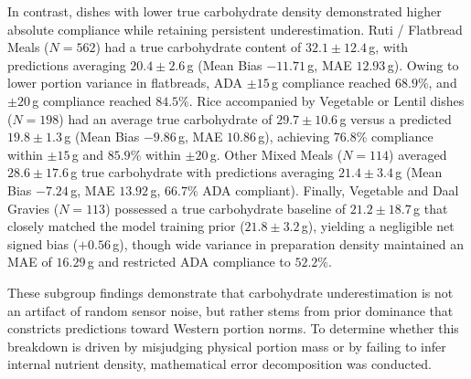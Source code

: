 \documentclass[utf8]{FrontiersinVancouver}
\begin{document}
In contrast, dishes with lower true carbohydrate density demonstrated higher absolute compliance while retaining persistent underestimation. Ruti / Flatbread Meals ($N=562$) had a true carbohydrate content of $32.1 \pm 12.4$\,g, with predictions averaging $20.4 \pm 2.6$\,g (Mean Bias $-11.71$\,g, MAE $12.93$\,g). Owing to lower portion variance in flatbreads, ADA $\pm 15$\,g compliance reached $68.9\%$, and $\pm 20$\,g compliance reached $84.5\%$. Rice accompanied by Vegetable or Lentil dishes ($N=198$) had an average true carbohydrate of $29.7 \pm 10.6$\,g versus a predicted $19.8 \pm 1.3$\,g (Mean Bias $-9.86$\,g, MAE $10.86$\,g), achieving $76.8\%$ compliance within $\pm 15$\,g and $85.9\%$ within $\pm 20$\,g. Other Mixed Meals ($N=114$) averaged $28.6 \pm 17.6$\,g true carbohydrate with predictions averaging $21.4 \pm 3.4$\,g (Mean Bias $-7.24$\,g, MAE $13.92$\,g, $66.7\%$ ADA compliant). Finally, Vegetable and Daal Gravies ($N=113$) possessed a true carbohydrate baseline of $21.2 \pm 18.7$\,g that closely matched the model training prior ($21.8 \pm 3.2$\,g), yielding a negligible net signed bias ($+0.56$\,g), though wide variance in preparation density maintained an MAE of $16.29$\,g and restricted ADA compliance to $52.2\%$.

These subgroup findings demonstrate that carbohydrate underestimation is not an artifact of random sensor noise, but rather stems from prior dominance that constricts predictions toward Western portion norms. To determine whether this breakdown is driven by misjudging physical portion mass or by failing to infer internal nutrient density, mathematical error decomposition was conducted.
\end{document}
